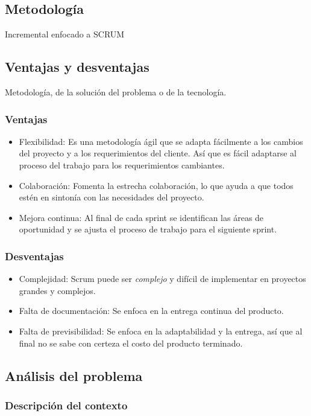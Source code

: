 \documentclass{article}
\begin{document}
\subsection{Metodología}
Incremental enfocado a SCRUM

\subsection{Ventajas y desventajas}
Metodología, de la solución del problema o de la tecnología.

\subsubsection*{Ventajas}
\begin{itemize}
	\item Flexibilidad: Es una metodología ágil que se adapta fácilmente a los cambios del proyecto y a los requerimientos del cliente. Así que es fácil adaptarse al proceso del trabajo para los requerimientos cambiantes.
	\item Colaboración: Fomenta la estrecha colaboración, lo que ayuda a que todos estén en sintonía con las necesidades del proyecto.
	\item Mejora continua: Al final de cada sprint se identifican las áreas de oportunidad y se ajusta el proceso de trabajo para el siguiente sprint.
\end{itemize}
\subsubsection*{Desventajas}
\begin{itemize}
	\item Complejidad: Scrum puede ser \emph{complejo} y difícil de implementar en proyectos grandes y complejos.
	\item Falta de documentación: Se enfoca en la entrega continua del producto.
	\item Falta de previsibilidad: Se enfoca en la adaptabilidad y la entrega, así que al final no se sabe con certeza el costo del producto terminado.
\end{itemize}

\subsection*{Análisis del problema}
\subsubsection{Descripción del contexto}
\end{document}
